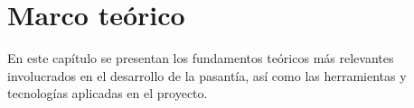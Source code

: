 \chapter{Marco teórico} \label{chap:marco_teorico}

\vspace{5 mm}

En este capítulo se presentan los fundamentos teóricos más relevantes involucrados en el desarrollo de la pasantía, así como las herramientas y tecnologías aplicadas en el proyecto.